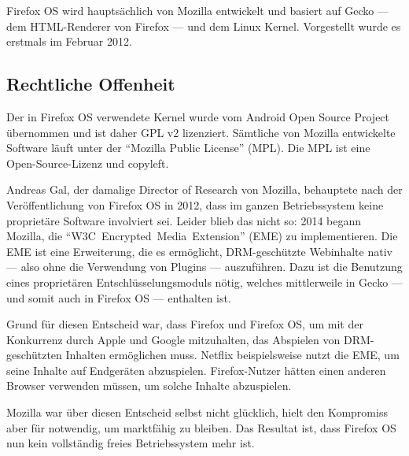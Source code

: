 Firefox OS wird hauptsächlich von Mozilla entwickelt und basiert auf Gecko --- dem HTML-Renderer von Firefox --- und dem Linux Kernel\thinspace\cite{online:ff-architecture}. Vorgestellt wurde es erstmals im Februar 2012\thinspace\cite{online:ff-techhive-b2g}.
\newline

\subsection{Rechtliche Offenheit}
Der in Firefox OS verwendete Kernel wurde vom Android Open Source Project übernommen und ist daher GPL v2 lizenziert\thinspace\cite{online:kernel-license}. Sämtliche von Mozilla entwickelte Software läuft unter der ``\mbox{Mozilla} Public License'' (MPL)\thinspace\cite{online:mozilla-licensing}. Die MPL ist eine \mbox{Open-Source-Lizenz} und copyleft\thinspace\cite{online:mpl}.

Andreas Gal, der damalige Director of Research von Mozilla, behauptete nach der Veröffentlichung von Firefox OS in 2012, dass im ganzen Betriebssystem keine proprietäre Software involviert sei\thinspace\cite{online:knowyourmobile-b2g}. Leider blieb das nicht so: 2014 begann Mozilla, die ``\mbox{W3C Encrypted Media Extension}'' (EME) zu implementieren\thinspace\cite{online:mozilla-eme}. Die EME  ist eine Erweiterung, die es ermöglicht, \mbox{DRM-geschützte} Webinhalte nativ --- also ohne die Verwendung von Plugins --- auszuführen. Dazu ist die Benutzung eines proprietären Entschlüsselungsmoduls nötig\thinspace\cite{online:mozilla-eme}, welches mittlerweile in Gecko --- und somit auch in Firefox OS --- enthalten ist.

Grund für diesen Entscheid war, dass Firefox und Firefox OS, um mit der Konkurrenz durch Apple und Google mitzuhalten, das Abspielen von \mbox{DRM-geschützten} Inhalten ermöglichen muss. Netflix beispielsweise nutzt die EME, um seine Inhalte auf Endgeräten abzuspielen. Firefox-Nutzer hätten einen anderen Browser verwenden müssen, um solche Inhalte abzuspielen\thinspace\cite{online:mozilla-eme}.

Mozilla war über diesen Entscheid selbst nicht glücklich\thinspace\cite{online:ff-drm-implementation}, hielt den Kompromiss aber für notwendig, um marktfähig zu bleiben. Das Resultat ist, dass Firefox OS nun kein vollständig freies Betriebssystem mehr ist. 
\newline

